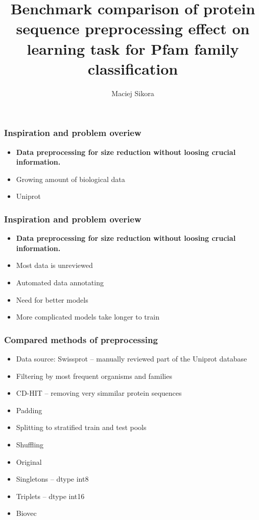 \documentclass[10pt]{beamer}
\title{Benchmark comparison of protein sequence preprocessing effect on learning task for Pfam family classification}
\author{Maciej Sikora}
\begin{document}
\frame{\titlepage}


\begin{frame}
\frametitle{Inspiration and problem overiew}
\begin{itemize}
\item \textbf{Data preprocessing for size reduction without loosing crucial information.}
\end{itemize}

\begin{itemize}
\item Growing amount of biological data
\item Uniprot
\end{itemize}
\end{frame}

\begin{frame}
\frametitle{Inspiration and problem overiew}
\begin{itemize}
\item \textbf{Data preprocessing for size reduction without loosing crucial information.}
\end{itemize}

\begin{itemize}
\item Most data is unreviewed
\item Automated data annotating
\item Need for better models
\item More complicated models take longer to train
\end{itemize}
\end{frame}

\begin{frame}
\frametitle{Compared methods of preprocessing}
\begin{itemize}
\item Data source: Swissprot -- manually reviewed part of the Uniprot database
\item Filtering by most frequent organisms and families
\item CD-HIT -- removing very simmilar protein sequences
\item Padding
\item Splitting to stratified train and test pools
\item Shuffling
\end{itemize}

\begin{itemize}
\item Original
\item Singletons -- dtype int8
\item Triplets -- dtype int16
\item Biovec
\end{itemize}

\end{frame}
\end{document}
